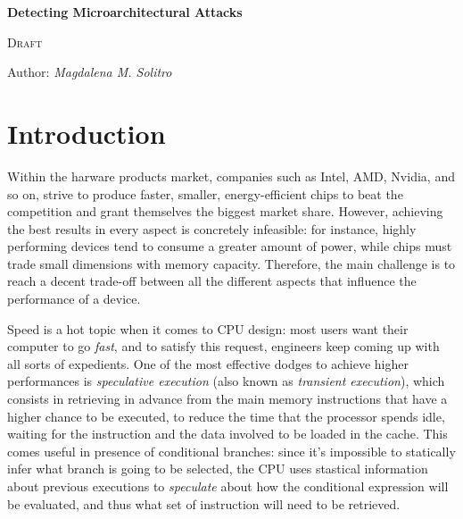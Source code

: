 \documentclass[12pt,a4paper]{book}
\theoremstyle{definition}
\begin{document}
	
	\begin{titlepage}
		\begin{center}
			\vspace*{1cm}
			
			\Huge
			\textbf{\Huge Detecting Microarchitectural Attacks}
			
			\vspace{0.3cm}
			\LARGE \textsc{Draft}
			
			\vspace{1.5cm}
			
			\large Author: \textit{Magdalena M. Solitro}
			
			\vfill
		\end{center}
	\end{titlepage}
	
	\tableofcontents
	
	\mainmatter

	\chapter{Introduction}\label{chapter:intro}
	Within the harware products market, companies such as Intel, AMD, Nvidia, and so on, strive to produce faster, smaller, energy-efficient chips to beat the competition and grant themselves the biggest market share. However, achieving the best results in every aspect is concretely infeasible: for instance, highly performing devices tend to consume a greater amount of power, while chips must trade small dimensions with memory capacity. Therefore, the main challenge is to reach a decent trade-off between all the different aspects that influence the performance of a device.

	Speed is a hot topic when it comes to CPU design: most users want their computer to go \textit{fast}, and to satisfy this request, engineers keep coming up with all sorts of expedients. One of the most effective dodges to achieve higher performances is \textit{speculative execution} (also known as \textit{transient execution}), which consists in retrieving in advance from the main memory instructions that have a higher chance to be executed, to reduce the time that the processor spends idle, waiting for the instruction and the data involved to be loaded in the cache. 
	This comes useful in presence of conditional branches: since it's impossible to statically infer what branch is going to be selected, the CPU uses stastical information about previous executions to \textit{speculate} about how the conditional expression will be evaluated, and thus what set of instruction will need to be retrieved.
	
\end{document}
